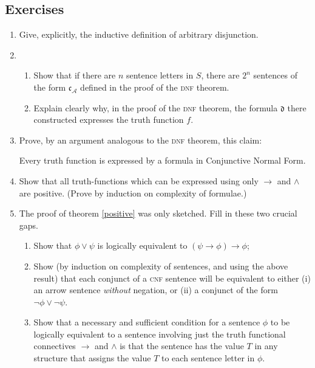 {\small

\subsection*{Exercises}

\begin{enumerate}
\item Give, explicitly, the inductive definition of arbitrary disjunction.
\item \begin{enumerate}
	
	\item Show that if there are $n$ sentence letters in $S$, there are $2^{n}$ sentences of the form $\mathfrak{c}_{\mathscr{A}}$ defined in the proof of the \textsc{\lowercase{DNF}} theorem.
\item Explain clearly why, in the proof of the \textsc{\lowercase{DNF}} theorem, the formula $\mathfrak{d}$ there constructed expresses the truth function $f$.
\end{enumerate}
\item  Prove, by an argument analogous to the \textsc{\lowercase{DNF}} theorem, this claim: \begin{theorem} 	Every truth function is expressed by a formula in Conjunctive Normal Form.\end{theorem}
\item Show that  all truth-functions which can be expressed using only $\to$ and $\wedge$ are positive. (Prove by induction on complexity of formulae.)

\item The proof of theorem \ref{positive} was only sketched. Fill in these two crucial gaps.\begin{enumerate} 
	\item Show that $\phi\vee \psi$ is logically equivalent to $(\psi \to \phi)\to \phi$;
	\item Show (by induction on complexity of sentences, and using the above result) that each conjunct of a \textsc{\lowercase{CNF}} sentence will be equivalent to either (i) an arrow sentence \emph{without} negation, or (ii)  a conjunct  of the form $\neg \phi \vee \neg \psi$.
		\item	 Show that a necessary and sufficient condition for a sentence $\phi$
	 to be logically equivalent to a sentence involving just the truth functional connectives $\to$ and 
	$\wedge$ is that the sentence has the value $T$ in any structure that assigns the
		    value $T$ to each sentence letter in $\phi$. \end{enumerate}


\end{enumerate}}
